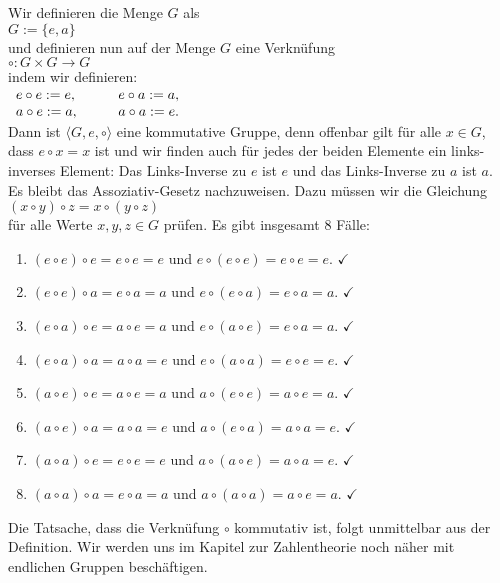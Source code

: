 \begin{enumerate}
      Wir definieren die Menge $G$ als
      \\[0.2cm]
      \hspace*{1.3cm}
      $G := \{ e, a \}$
      \\[0.2cm]
      und definieren nun auf der Menge $G$ eine Verkn\"{u}fung
      \\[0.2cm]
      \hspace*{1.3cm}
      $\circ: G \times G \rightarrow G$
      \\[0.2cm]
      indem wir definieren:
      \\[0.2cm]
      \hspace*{1.3cm}
      $
      \begin{array}[t]{lcl}
        e \circ e := e, & \quad & e \circ a := a, \\
        a \circ e := a, & \quad & a \circ a := e. 
      \end{array}
      $
      \\[0.2cm]
      Dann ist $\langle G, e, \circ \rangle$ eine kommutative Gruppe, denn offenbar gilt f\"{u}r alle $x \in G$, dass 
      $e \circ x = x$ ist und wir finden auch f\"{u}r jedes der beiden Elemente ein links-inverses Element:
      Das Links-Inverse zu $e$ ist $e$ und das Links-Inverse zu $a$ ist $a$.  Es bleibt das
      Assoziativ-Gesetz nachzuweisen.  Dazu m\"{u}ssen wir die Gleichung
      \\[0.2cm]
      \hspace*{1.3cm}
      $(x \circ y) \circ z = x \circ (y \circ z)$
      \\[0.2cm]
      f\"{u}r alle Werte $x,y,z \in G$ pr\"{u}fen.  Es gibt insgesamt 8 F\"{a}lle:
      \begin{enumerate}
      \item $(e \circ e) \circ e = e \circ e = e$ und $e \circ (e \circ e) = e \circ e = e$. $\checkmark$
      \item $(e \circ e) \circ a = e \circ a = a$ und $e \circ (e \circ a) = e \circ a = a$. $\checkmark$
      \item $(e \circ a) \circ e = a \circ e = a$ und $e \circ (a \circ e) = e \circ a = a$. $\checkmark$
      \item $(e \circ a) \circ a = a \circ a = e$ und $e \circ (a \circ a) = e \circ e = e$. $\checkmark$
      \item $(a \circ e) \circ e = a \circ e = a$ und $a \circ (e \circ e) = a \circ e = a$. $\checkmark$
      \item $(a \circ e) \circ a = a \circ a = e$ und $a \circ (e \circ a) = a \circ a = e$. $\checkmark$
      \item $(a \circ a) \circ e = e \circ e = e$ und $a \circ (a \circ e) = a \circ a = e$. $\checkmark$
      \item $(a \circ a) \circ a = e \circ a = a$ und $a \circ (a \circ a) = a \circ e = a$. $\checkmark$
      \end{enumerate}
      Die Tatsache, dass die Verkn\"{u}fung $\circ$ kommutativ ist, folgt unmittelbar aus der Definition.
      Wir werden uns im Kapitel zur Zahlentheorie noch n\"{a}her mit endlichen Gruppen besch\"{a}ftigen.
      \eox
\end{enumerate}

